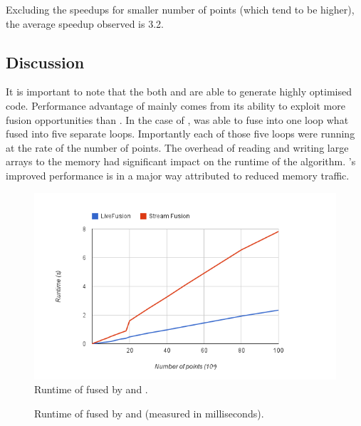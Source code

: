 \documentclass[preamble.tex]{subfiles}
\begin{document}
Excluding the speedups for smaller number of points (which tend to be higher), the average speedup observed is 3.2.


\subsection{Discussion}

It is important to note that the both \LiveFusion and \StreamFusion are able to generate highly optimised code. Performance advantage of \LiveFusion mainly comes from its ability to exploit more fusion opportunities than \StreamFusion. In the case of \FilterMax, \LiveFusion was able to fuse into one loop what \StreamFusion fused into five separate loops. Importantly each of those five loops were running at the rate of the number of points. The overhead of reading and writing large arrays to the memory had significant impact on the runtime of the algorithm. \LiveFusion's improved performance is in a major way attributed to reduced memory traffic.



\begin{figure}
\includegraphics[scale=0.85,center]{img/Eval-FarAndAboves}
\caption{Runtime of \FilterMax fused by \StreamFusion and \LiveFusion.}
\label{fig:Eval-FarAndAboves}
\end{figure}

\begin{figure}
\caption{Runtime of \FilterMax fused by \StreamFusion and \LiveFusion (measured in milliseconds).}
\label{fig:Eval-FarAndAboves-numbers}
\end{figure}








\IfNotCompilingAll{\printbibliography}
\end{document}
